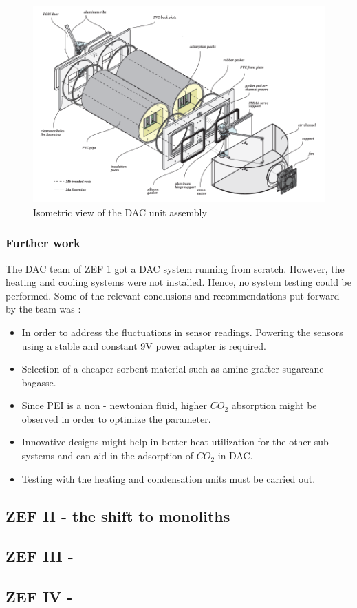 \begin{figure}[H]
    \centering
    \includegraphics[width=\linewidth]{images/previouswork/zef1ass.png}
    \caption{Isometric view of the DAC unit assembly \cite{Azzalini2018}}
    \label{fig:zef1ass}
\end{figure}

\subsubsection{Further work}
The DAC team of ZEF 1 got a DAC system running from scratch. However, the heating and cooling systems were not installed. Hence, no system testing could be performed. Some of the relevant conclusions and recommendations put forward by the team was :

\begin{itemize}
    \item In order to address the fluctuations in sensor readings. Powering the sensors using a stable and constant 9V power adapter is required. 
    \item Selection of a cheaper sorbent material such as amine grafter sugarcane bagasse. 
    \item Since PEI is a non - newtonian fluid, higher $CO_2$ absorption might be observed in order to optimize the parameter. 
    \item Innovative designs might help in better heat utilization for the other sub-systems and can aid in the adsorption of $CO_2$ in DAC. 
    \item Testing with the heating and condensation units must be carried out. 
\end{itemize}

\subsection{ZEF II - the shift to monoliths}




\subsection{ZEF III - }



\subsection{ZEF IV - }
\label{sec:zef4}














